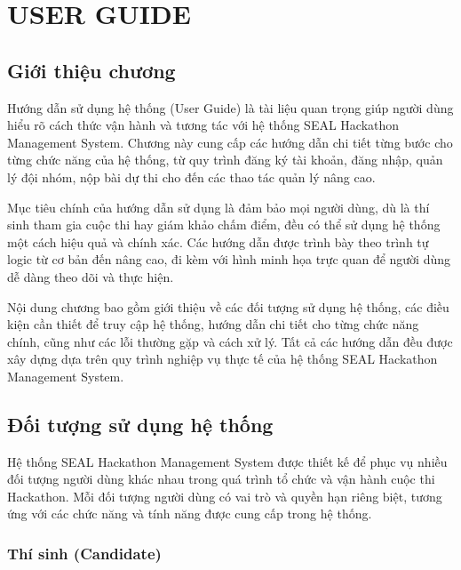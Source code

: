 
\chapter{USER GUIDE}

\section{Giới thiệu chương}

Hướng dẫn sử dụng hệ thống (User Guide) là tài liệu quan trọng giúp người dùng hiểu rõ cách thức vận hành và tương tác với hệ thống SEAL Hackathon Management System. Chương này cung cấp các hướng dẫn chi tiết từng bước cho từng chức năng của hệ thống, từ quy trình đăng ký tài khoản, đăng nhập, quản lý đội nhóm, nộp bài dự thi cho đến các thao tác quản lý nâng cao.

Mục tiêu chính của hướng dẫn sử dụng là đảm bảo mọi người dùng, dù là thí sinh tham gia cuộc thi hay giám khảo chấm điểm, đều có thể sử dụng hệ thống một cách hiệu quả và chính xác. Các hướng dẫn được trình bày theo trình tự logic từ cơ bản đến nâng cao, đi kèm với hình minh họa trực quan để người dùng dễ dàng theo dõi và thực hiện.

Nội dung chương bao gồm giới thiệu về các đối tượng sử dụng hệ thống, các điều kiện cần thiết để truy cập hệ thống, hướng dẫn chi tiết cho từng chức năng chính, cũng như các lỗi thường gặp và cách xử lý. Tất cả các hướng dẫn đều được xây dựng dựa trên quy trình nghiệp vụ thực tế của hệ thống SEAL Hackathon Management System.


\section{Đối tượng sử dụng hệ thống}

Hệ thống SEAL Hackathon Management System được thiết kế để phục vụ nhiều đối tượng người dùng khác nhau trong quá trình tổ chức và vận hành cuộc thi Hackathon. Mỗi đối tượng người dùng có vai trò và quyền hạn riêng biệt, tương ứng với các chức năng và tính năng được cung cấp trong hệ thống.

\subsection{Thí sinh (Candidate)}

